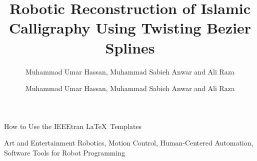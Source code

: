\documentclass[lettersize,journal,onecolumn]{IEEEtran}
\begin{document}
\title{Robotic Reconstruction of Islamic Calligraphy Using Twisting Bezier Splines}
\author{Muhammad Umar Hassan, Muhammad Sabieh Anwar and Ali Raza
}

%
{How to Use the IEEEtran \LaTeX \ Templates}

\maketitle

\author{Muhammad Umar Hassan, Muhammad Sabieh Anwar and Ali Raza}
\begin{paracol}{2}
    \switchcolumn[0]
    
    \begin{IEEEkeywords}
    Art and Entertainment Robotics, Motion Control, Human-Centered Automation, Software Tools for Robot Programming
    \end{IEEEkeywords}
    
    
    
    
\end{paracol}
\end{document}
